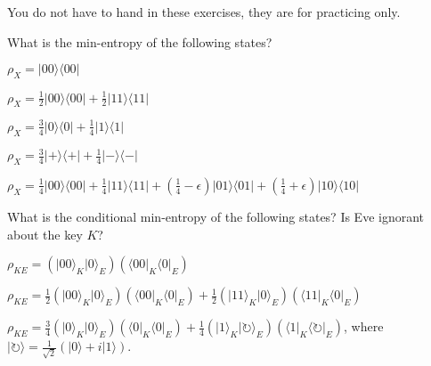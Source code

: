 \documentclass[a4paper,10pt,landscape,twocolumn]{scrartcl}
\newcommand{\ket}[1]{\lvert #1 \rangle}
\newcommand{\bra}[1]{\langle #1 \rvert}
\begin{document}
\practiceproblems

{\sffamily\noindent
You do not have to hand in these exercises, they are for practicing only. %
}

\begin{exercise}
What is the min-entropy of the following states?
\begin{subex}
$\rho_X = \ket{00}\bra{00}$
\end{subex}
\begin{subex}
$\rho_X = \frac{1}{2} \ket{00}\bra{00} + \frac{1}{2} \ket{11}\bra{11}$
\end{subex}
\begin{subex}
$\rho_X = \frac{3}{4} \ket{0}\bra{0} + \frac{1}{4} \ket{1}\bra{1}$
\end{subex}
\begin{subex}
$\rho_X = \frac{3}{4} \ket{+}\bra{+} + \frac{1}{4} \ket{-}\bra{-}$
\end{subex}
\begin{subex}
$\rho_X = \frac{1}{4} \ket{00}\bra{00} + \frac{1}{4} \ket{11}\bra{11} + \left(\frac{1}{4} - \epsilon\right) \ket{01}\bra{01} + \left(\frac{1}{4}+\epsilon\right) \ket{10}\bra{10}$
\end{subex}
\noindent What is the conditional min-entropy of the following states? Is Eve ignorant about the key $K$?
\begin{subex}
$\rho_{KE} = (\ket{00}_K \ket0_E)(\bra{00}_K\bra0_E)$
\end{subex}
\begin{subex}
$\rho_{KE} = \frac{1}{2}(\ket{00}_K \ket0_E)(\bra{00}_K\bra0_E) + \frac{1}{2}(\ket{11}_K \ket0_E)(\bra{11}_K\bra0_E)$
\end{subex}
\begin{subex}
$\rho_{KE} = \frac{3}{4} (\ket{0}_K\ket0_E)(\bra{0}_K\bra0_E) + \frac{1}{4} (\ket{1}_K\ket{\circlearrowright}_E)(\bra{1}_K\bra\circlearrowright_E)$, where $\ket{\circlearrowright} = \frac{1}{\sqrt{2}}(\ket0 + i \ket1)$.
\end{subex}
\end{exercise}
\end{document}
